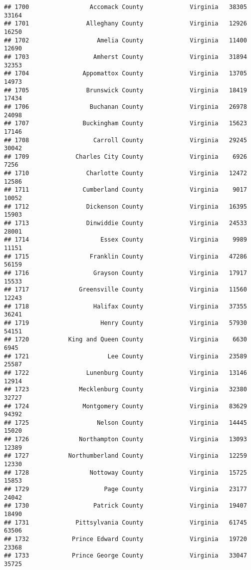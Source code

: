 \documentclass[
]{article}
\begin{document}
\begin{verbatim}
## 1700                 Accomack County             Virginia   38305   33164
## 1701                Alleghany County             Virginia   12926   16250
## 1702                   Amelia County             Virginia   11400   12690
## 1703                  Amherst County             Virginia   31894   32353
## 1704               Appomattox County             Virginia   13705   14973
## 1705                Brunswick County             Virginia   18419   17434
## 1706                 Buchanan County             Virginia   26978   24098
## 1707               Buckingham County             Virginia   15623   17146
## 1708                  Carroll County             Virginia   29245   30042
## 1709             Charles City County             Virginia    6926    7256
## 1710                Charlotte County             Virginia   12472   12586
## 1711               Cumberland County             Virginia    9017   10052
## 1712                Dickenson County             Virginia   16395   15903
## 1713                Dinwiddie County             Virginia   24533   28001
## 1714                    Essex County             Virginia    9989   11151
## 1715                 Franklin County             Virginia   47286   56159
## 1716                  Grayson County             Virginia   17917   15533
## 1717              Greensville County             Virginia   11560   12243
## 1718                  Halifax County             Virginia   37355   36241
## 1719                    Henry County             Virginia   57930   54151
## 1720           King and Queen County             Virginia    6630    6945
## 1721                      Lee County             Virginia   23589   25587
## 1722                Lunenburg County             Virginia   13146   12914
## 1723              Mecklenburg County             Virginia   32380   32727
## 1724               Montgomery County             Virginia   83629   94392
## 1725                   Nelson County             Virginia   14445   15020
## 1726              Northampton County             Virginia   13093   12389
## 1727           Northumberland County             Virginia   12259   12330
## 1728                 Nottoway County             Virginia   15725   15853
## 1729                     Page County             Virginia   23177   24042
## 1730                  Patrick County             Virginia   19407   18490
## 1731             Pittsylvania County             Virginia   61745   63506
## 1732            Prince Edward County             Virginia   19720   23368
## 1733            Prince George County             Virginia   33047   35725

\end{verbatim}
\end{document}
